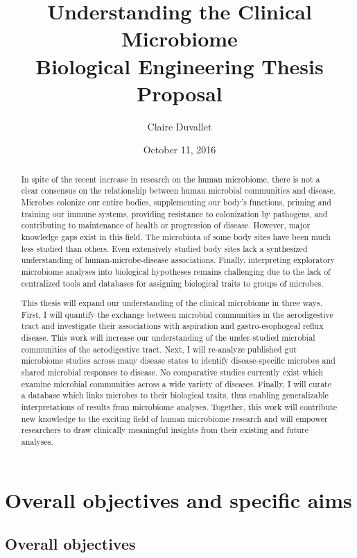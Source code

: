 \documentclass[12pt]{article}
\title{Understanding the Clinical Microbiome \\ Biological Engineering Thesis Proposal}
\author{Claire Duvallet}
\date{October 11, 2016}
\begin{document}
\maketitle
\newpage
\tableofcontents
\newpage
\begin{abstract}
In spite of the recent increase in research on the human 
microbiome, there is not a clear consensus on the relationship between 
human microbial communities and disease. Microbes colonize our entire bodies,
supplementing our body's functions, priming and training our immune 
systems, providing resistance to colonization 
by pathogens, and contributing to maintenance of health or progression of disease. 
However, major knowledge gaps exist in this field. 
The microbiota of some body sites have been much less studied than others.
Even extensively studied body sites lack a synthesized understanding of human-microbe-disease associations. 
Finally, interpreting exploratory microbiome analyses into biological hypotheses
remains challenging due to the lack of centralized tools and databases
for assigning biological traits to groups of microbes.

This thesis will expand our understanding of the clinical microbiome in three ways.
First, I will quantify the exchange between microbial communities
in the aerodigestive tract and investigate their associations with aspiration
and gastro-esophogeal reflux disease. 
This work will increase our understanding of the 
under-studied microbial communities of the aerodigestive tract.
Next, I will re-analyze published gut microbiome studies
across many disease states to identify disease-specific microbes
and shared microbial responses to disease.
No comparative studies currently exist which examine microbial communities
across a wide variety of diseases.
Finally, I will curate a database which links microbes to their biological traits, 
thus enabling generalizable interpretations of results from microbiome analyses.
Together, this work will contribute new knowledge
to the exciting field of human microbiome research and will 
empower researchers to draw clinically meaningful insights 
from their existing and future analyses.

\end{abstract}
\newpage

\section{Overall objectives and specific aims}
\subsection{Overall objectives}
\end{document}

